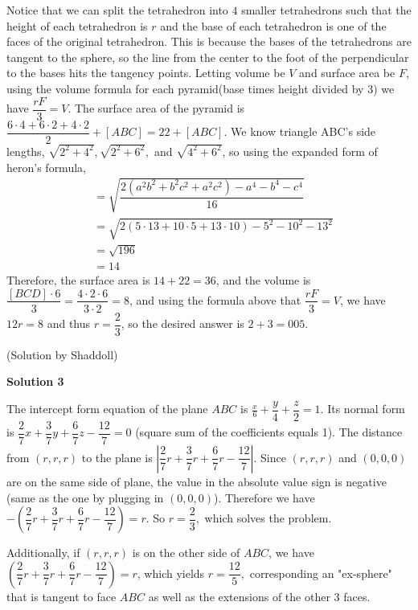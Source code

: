 \begin{enumerate}
Notice that we can split the tetrahedron into $4$ smaller tetrahedrons such that the height of each tetrahedron is $r$ and the base of each tetrahedron is one of the faces of the original tetrahedron. This is because the bases of the tetrahedrons are tangent to the sphere, so the line from the center to the foot of the perpendicular to the bases hits the tangency points. Letting volume be $V$ and surface area be $F$, using the volume formula for each pyramid(base times height divided by 3) we have $\dfrac{rF}{3}=V$. The surface area of the pyramid is $\dfrac{6\cdot{4}+6\cdot{2}+4\cdot{2}}{2}+[ABC]=22+[ABC]$. We know triangle ABC's side lengths, $\sqrt{2^{2}+4^{2}}, \sqrt{2^{2}+6^{2}},$ and $\sqrt{4^{2}+6^{2}}$, so using the expanded form of heron's formula, 
 \begin{align*}[ABC]&=\sqrt{\dfrac{2(a^{2}b^{2}+b^{2}c^{2}+a^{2}c^{2})-a^{4}-b^{4}-c^{4}}{16}}\\ &=\sqrt{2(5\cdot{13}+10\cdot{5}+13\cdot{10})-5^{2}-10^{2}-13^{2}}\\ &=\sqrt{196}\\ &=14\end{align*}
Therefore, the surface area is $14+22=36$, and the volume is $\dfrac{[BCD]\cdot{6}}{3}=\dfrac{4\cdot{2}\cdot{6}}{3\cdot{2}}=8$, and using the formula above that $\dfrac{rF}{3}=V$, we have $12r=8$ and thus $r=\dfrac{2}{3}$, so the desired answer is $2+3=\boxed{005}$.

 (Solution by Shaddoll)

 



\textbf{Solution 3}

The intercept form equation of the plane $ABC$ is $\frac{x}{6}+\dfrac{y}{4}+\dfrac{z}{2}=1.$ Its normal form is $\dfrac{2}{7}x+\dfrac{3}{7}y+\dfrac{6}{7}z-\dfrac{12}{7}=0$ (square sum of the coefficients equals 1). The distance from $(r,r,r)$ to the plane is $\left |\dfrac{2}{7}r+\dfrac{3}{7}r+\dfrac{6}{7}r-\dfrac{12}{7}\right |$. Since $(r,r,r)$ and $(0,0,0)$ are on the same side of plane, the value in the absolute value sign is negative (same as the one by plugging in $(0,0,0)$). Therefore we have $-\left (\dfrac{2}{7}r+\dfrac{3}{7}r+\dfrac{6}{7}r-\dfrac{12}{7}\right )=r.$ So $r=\dfrac{2}{3},$ which solves the problem.

 Additionally, if $(r,r,r)$ is on the other side of $ABC$, we have $\left (\dfrac{2}{7}r+\dfrac{3}{7}r+\dfrac{6}{7}r-\dfrac{12}{7}\right )=r$, which yields $r=\dfrac{12}{5},$ corresponding an "ex-sphere" that is tangent to face $ABC$ as well as the extensions of the other 3 faces.


\end{enumerate}

